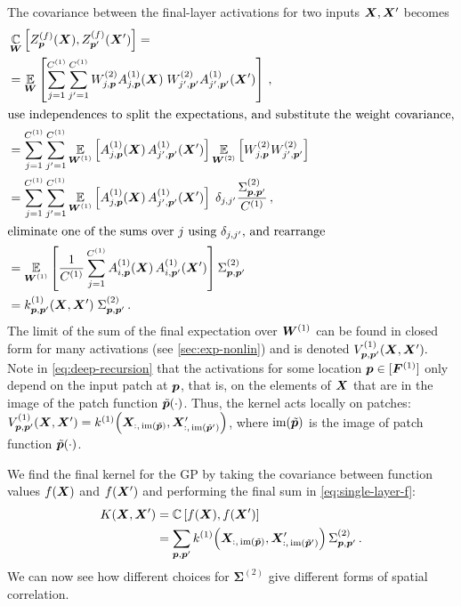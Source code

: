 \documentclass[accepted]{uai2021} %
\newcommand{\layerAsd}[2]{Z^{(#1)}_{#2}(\vX')}
\newcommand{\layerAs}[2]{Z^{(#1)}_{#2}(\vX)}
\newcommand{\layerC}[1]{C^{(#1)}}
\newcommand{\layerNLAsd}[2]{A^{(#1)}_{#2}(\vX')}
\newcommand{\layerNLAs}[2]{A^{(#1)}_{#2}(\vX)}
\newcommand{\layerWs}[1]{W^{(#1)}}
\newcommand{\layerW}[1]{\mW^{(#1)}}
\newcommand{\layersizebase}{\vF}
\newcommand{\layersize}[1]{{\layersizebase^{\bra{#1}}}}
\newcommand{\patchf}[2]{{\tilde#1\bra{#2}}}
\newcommand{\convpatch}[1]{{\text{im}\bra{\tilde#1}}}
\newcommand{\priorWcovs}[1]{\Sigma^{(#1)}}
\newcommand{\priorWcov}[1]{\boldsymbol{\Sigma}^{(#1)}}
\newcommand{\chan}{i}
\newcommand{\prevchan}{j}   %
\newcommand{\patch}{\vp}               %
\newcommand{\nlinf}[1]{V\ssup{#1}}
\newcommand{\0}{\boldsymbol{0}}
\newcommand{\1}{\boldsymbol{1}}
\begin{document}
The covariance between the final-layer activations for two inputs ${\bm{X}},{\bm{X}}'$ becomes
\begin{align}
  &\Cov_{\vW}\left[\layerAs{f}{\patch},\layerAsd{f}{\patch'}\right] = \nonumber\\ &=\Expect{\vW}{\sum_{\prevchan=1}^{\layerC1}\sum_{\prevchan'=1}^{\layerC1} \layerWs{2}_{\prevchan,\patch}\layerNLAs{1}{\prevchan,\patch}\; \layerWs{2}_{\prevchan',\patch'}\layerNLAsd{1}{\prevchan',\patch'}}\,, \nonumber \\
  \intertext{use independences to split the expectations, and substitute the weight covariance,}
    &= \sum_{\prevchan=1}^{\layerC1}\sum_{\prevchan'=1}^{\layerC1} \Expect{\layerW1}{\layerNLAs{1}{\prevchan,\patch}\,\layerNLAsd{1}{\prevchan',\patch'}}\Expect{\layerW2}{\layerWs{2}_{\prevchan,\patch} \layerWs{2}_{\prevchan',\patch'}} \nonumber \\
  &= \sum_{\prevchan=1}^{\layerC1}\sum_{\prevchan'=1}^{\layerC1} \Expect{\layerW1}{\layerNLAs{1}{\prevchan,\patch}\,\layerNLAsd{1}{\prevchan',\patch'}}\;\delta_{\prevchan,\prevchan'}
    \frac{\priorWcovs{2}_{\patch,\patch'}}{\layerC{1}}\,,\nonumber \\
  \intertext{eliminate one of the sums over $\prevchan$ using $\delta_{\prevchan,\prevchan'}$, and rearrange}
  &= \Expect{\layerW1}{
\frac{1}{\layerC1}\sum_{\prevchan=1}^{\layerC1} \layerNLAs{1}{\chan,\patch}\,\layerNLAsd{1}{\chan,\patch'}}
    \priorWcovs{2}_{\patch,\patch'} \nonumber \\
  &=  k\ssup{1}_{\patch,\patch'}\bra{\mX,\mX'}  \;\priorWcovs{2}_{\patch,\patch'} \,.
\end{align}
The limit of the sum of the final expectation over $\layerW1$ can be found in closed form for many activations (see \cref{sec:exp-nonlin}) and is denoted $\nlinf{1}_{\patch,\patch'}\bra{\mX,\mX'}.$
Note in \cref{eq:deep-recursion} that the activations for some location $\patch\in\countto{\layersize{1}}$ only depend on the input patch at $\patch$, that is, on the elements of ${\bm{X}}$ that are in the image of the patch function $\patchf{\patch}{\cdot}$. Thus, the kernel acts locally on patches:
$\nlinf{1}_{\patch,\patch'}\bra{\mX,\mX'} = k\ssup{1}\bra{\mX_{:,\,\convpatch{\patch}},\mX'_{:,\,\convpatch{\patch'}}}$, where $\convpatch{\patch}$ is the image of patch function $\patchf{\patch}{\cdot}$.

We find the final kernel for the GP by taking the covariance between function values $f({\bm{X}})$ and $f({\bm{X}}')$ and performing the final sum in \cref{eq:single-layer-f}:
\begin{align}
    K(\vX, \vX') &= \Cov\left[f(\vX), f(\vX')\right] \nonumber\\
    &= \sum_{\patch,\patch'} k\ssup{1}\bra{\mX_{:,\,\convpatch{\patch}},\mX'_{:,\,\convpatch{\patch'}}}\, \priorWcovs{2}_{\patch,\patch'} \label{eq:cov-kernel} \,.
\end{align}
We can now see how different choices for $\priorWcov2$ give different forms of spatial correlation.
\end{document}

